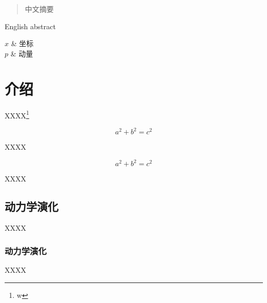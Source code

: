 \documentclass[type=doctor]{YNUthesis} %
\begin{document}
\raggedbottom

\frontmatter

\begin{abstract}
	中文摘要
\end{abstract}

\begin{abstract*}
	English abstract
\end{abstract*}

\tableofcontents
\listoffigures
\listoftables

\begin{notation}[ll]
	$x$                  & 坐标        \\
	$p$                  & 动量        \\
\end{notation}

\mainmatter



\chapter{介绍}
XXXX\footnote{w}\cite{YDTR}

\[
	a^2+b^2=c^2
\]

XXXX

\begin{equation}
	a^2+b^2=c^2
\end{equation}

XXXX

\section{动力学演化}
XXXX

\subsection{动力学演化}
XXXX
\end{document}
